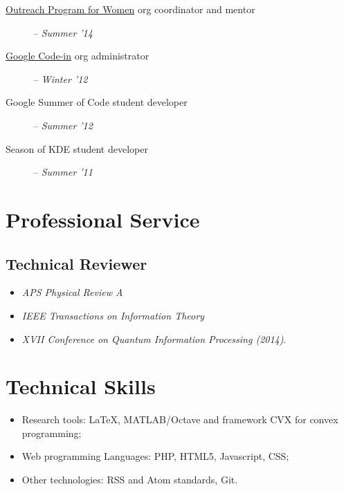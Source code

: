 \documentclass[]{article}
\begin{document}
\begin{description}
\item[\href{https://gnome.org/opw/}{Outreach Program for Women}
org coordinator and mentor] -- \emph{Summer '14}
\item[\href{https://www.google-melange.com/gci/homepage/google/gci2012}{Google
Code-in} org administrator] -- \emph{Winter '12}
\item[Google Summer of Code student developer] -- \emph{Summer '12}
\item[Season of KDE student developer]  -- \emph{Summer '11}
\end{description}

\section{Professional Service}\label{professional-service}

\subsection{Technical Reviewer} 
\begin{itemize}
  \item \emph{APS Physical Review A}
  \item \emph{IEEE Transactions on Information Theory}
  \item \emph{XVII Conference on Quantum Information Processing (2014)}.
\end{itemize}

\section{Technical Skills}\label{technical-skills}

\begin{itemize}
\itemsep1pt\parskip0pt
\item
  Research tools: LaTeX, MATLAB/Octave and framework CVX for convex
  programming;
\item
  Web programming Languages: PHP, HTML5, Javascript, CSS;
\item
  Other technologies: RSS and Atom standards, Git.
\end{itemize}
\end{document}
